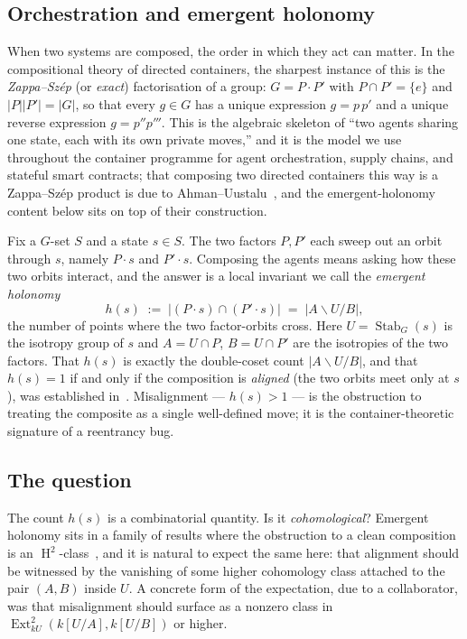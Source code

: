 \documentclass[11pt]{amsart}
\theoremstyle{plain}
\theoremstyle{definition}
\DeclareMathOperator{\Ext}{Ext}
\DeclareMathOperator{\Stab}{Stab}
\DeclareMathOperator{\Hh}{H}
\newcommand{\dcoset}[3]{#1\backslash #2/#3}
\begin{document}
\subsection*{Orchestration and emergent holonomy}
When two systems are composed, the order in which they act can matter. In the
compositional theory of directed containers, the sharpest instance of this is the
\emph{Zappa--Sz\'ep} (or \emph{exact}) factorisation of a group: $G=P\cdot P'$ with
$P\cap P'=\{e\}$ and $\lvert P\rvert\lvert P'\rvert=\lvert G\rvert$, so that every
$g\in G$ has a unique expression $g=p\,p'$ and a unique reverse expression $g=p''p'''$.
This is the algebraic skeleton of ``two agents sharing one state, each with its own
private moves,'' and it is the model we use throughout the container programme for
agent orchestration, supply chains, and stateful smart contracts; that composing two
directed containers this way is a Zappa--Sz\'ep product is due to
Ahman--Uustalu~\cite{au-distlaw}, and the emergent-holonomy content below sits on top of
their construction.

Fix a $G$-set $S$ and a state $s\in S$. The two factors $P,P'$ each sweep out an orbit
through $s$, namely $P\cdot s$ and $P'\cdot s$. Composing the agents means asking how
these two orbits interact, and the answer is a local invariant we call the
\emph{emergent holonomy}
\[
   h(s)\;:=\;\bigl\lvert (P\cdot s)\cap(P'\cdot s)\bigr\rvert
   \;=\;\lvert \dcoset{A}{U}{B}\rvert,
\]
the number of points where the two factor-orbits cross. Here $U=\Stab_G(s)$ is the
isotropy group of $s$ and $A=U\cap P$, $B=U\cap P'$ are the isotropies of the two
factors. That $h(s)$ is exactly the double-coset count $\lvert\dcoset{A}{U}{B}\rvert$,
and that $h(s)=1$ if and only if the composition is \emph{aligned} (the two orbits meet
only at $s$), was established in~\cite{macbeth-meeting}. Misalignment --- $h(s)>1$ ---
is the obstruction to treating the composite as a single well-defined move; it is the
container-theoretic signature of a reentrancy bug.

\subsection*{The question}
The count $h(s)$ is a combinatorial quantity. Is it \emph{cohomological}? Emergent
holonomy sits in a family of results where the obstruction to a clean composition is an
$\Hh^2$-class~\cite{macbeth-zs,macbeth-reentrancy}, and it is natural to expect the same
here: that alignment should be witnessed by the vanishing of some higher cohomology
class attached to the pair $(A,B)$ inside $U$. A concrete form of the expectation, due to
a collaborator, was that misalignment should surface as a nonzero class in
$\Ext^2_{kU}(k[U/A],k[U/B])$ or higher.
\end{document}
